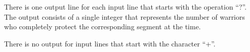 There is one output line for each input line that starts with the operation “?”. The output consists of a single integer that represents the number of warriors who completely protect the corresponding segment at the time.   

     There is no output for input lines that start with the character “+”.    

\